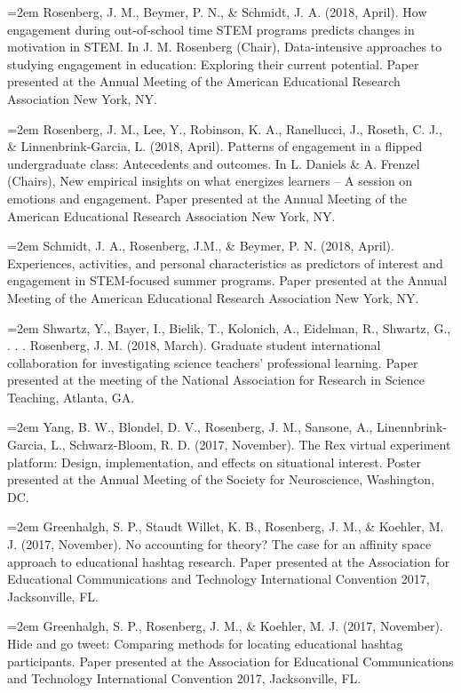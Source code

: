 \documentclass[]{article}
\begin{document}
\hangindent=2em Rosenberg, J. M., Beymer, P. N., \& Schmidt, J. A.
(2018, April). How engagement during out-of-school time STEM programs
predicts changes in motivation in STEM. In J. M. Rosenberg (Chair),
Data-intensive approaches to studying engagement in education: Exploring
their current potential. Paper presented at the Annual Meeting of the
American Educational Research Association New York, NY.

\hangindent=2em Rosenberg, J. M., Lee, Y., Robinson, K. A., Ranellucci,
J., Roseth, C. J., \& Linnenbrink-Garcia, L. (2018, April). Patterns of
engagement in a flipped undergraduate class: Antecedents and outcomes.
In L. Daniels \& A. Frenzel (Chairs), New empirical insights on what
energizes learners -- A session on emotions and engagement. Paper
presented at the Annual Meeting of the American Educational Research
Association New York, NY.

\hangindent=2em Schmidt, J. A., Rosenberg, J.M., \& Beymer, P. N. (2018,
April). Experiences, activities, and personal characteristics as
predictors of interest and engagement in STEM-focused summer programs.
Paper presented at the Annual Meeting of the American Educational
Research Association New York, NY.

\hangindent=2em Shwartz, Y., Bayer, I., Bielik, T., Kolonich, A.,
Eidelman, R., Shwartz, G., . . . Rosenberg, J. M. (2018, March).
Graduate student international collaboration for investigating science
teachers' professional learning. Paper presented at the meeting of the
National Association for Research in Science Teaching, Atlanta, GA.

\hangindent=2em Yang, B. W., Blondel, D. V., Rosenberg, J. M., Sansone,
A., Linennbrink-Garcia, L., Schwarz-Bloom, R. D. (2017, November). The
Rex virtual experiment platform: Design, implementation, and effects on
situational interest. Poster presented at the Annual Meeting of the
Society for Neuroscience, Washington, DC.

\hangindent=2em Greenhalgh, S. P., Staudt Willet, K. B., Rosenberg, J.
M., \& Koehler, M. J. (2017, November). No accounting for theory? The
case for an affinity space approach to educational hashtag research.
Paper presented at the Association for Educational Communications and
Technology International Convention 2017, Jacksonville, FL.

\hangindent=2em Greenhalgh, S. P., Rosenberg, J. M., \& Koehler, M. J.
(2017, November). Hide and go tweet: Comparing methods for locating
educational hashtag participants. Paper presented at the Association for
Educational Communications and Technology International Convention 2017,
Jacksonville, FL.
\end{document}
